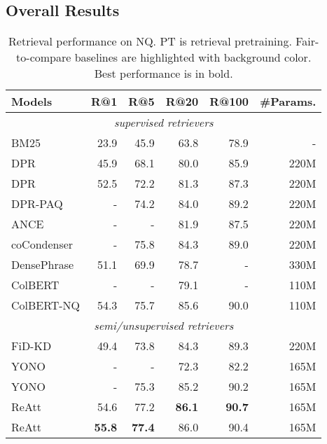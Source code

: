 \documentclass[11pt, dvipsnames]{article}
\def\middlecol{\hskip 6pt}
\newcommand{\ours}{ReAtt\xspace}
\newcommand{\hlrow}{\rowcolor{LightCyan!50}}
\begin{document}
\subsection{Overall Results}
\begin{table}[tb]
\centering
\small
\begin{tabular}{l@{\middlecol}r@{\middlecol}r@{\middlecol}r@{\middlecol}r@{\middlecol}r}
\toprule
\textbf{Models} & \textbf{R@1} & \textbf{R@5} & \textbf{R@20} & \textbf{R@100} & \textbf{\#Params.} \\
\midrule
\multicolumn{6}{c}{\emph{supervised retrievers}} \\
BM25 & 23.9 & 45.9 & 63.8 & 78.9 & - \\
DPR & 45.9 & 68.1 & 80.0 & 85.9 & 220M \\
DPR & 52.5 & 72.2 & 81.3 & 87.3 & 220M \\
DPR-PAQ & - & 74.2 & 84.0 & 89.2 & 220M \\
ANCE & - & - & 81.9 & 87.5 & 220M \\
coCondenser & - & 75.8 & 84.3 & 89.0 & 220M \\
DensePhrase & 51.1 & 69.9 & 78.7 & - & 330M \\
ColBERT & - & - & 79.1 & - & 110M \\
\hlrow ColBERT-NQ & 54.3 & 75.7 & 85.6 & 90.0 & 110M \\
\midrule
\multicolumn{6}{c}{\emph{semi/unsupervised retrievers}} \\
\hlrow FiD-KD & 49.4 & 73.8 & 84.3 & 89.3 & 220M \\
\hlrow YONO & - & - & 72.3 & 82.2 & 165M \\
\hlrow YONO & - & 75.3 & 85.2 & 90.2 & 165M \\
\ours & 54.6 & 77.2 & \textbf{86.1} & \textbf{90.7} & 165M \\
\ours & \textbf{55.8} & \textbf{77.4} & 86.0 & 90.4 & 165M \\
\bottomrule
\end{tabular}
\caption{Retrieval performance on NQ. PT is retrieval pretraining. Fair-to-compare baselines are highlighted with background color. Best performance is in bold.}
\label{tab:nq_ret}
\end{table}
\end{document}
